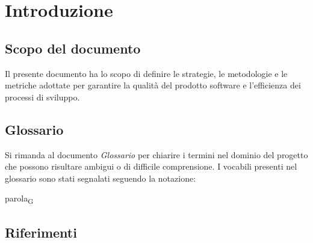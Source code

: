 \documentclass[a4paper,12pt]{article}
\begin{document}
    \tableofcontents
    \newpage

    \listoffigures
    \newpage

    \listoftables
    \newpage
    
    \section{Introduzione} {
        \subsection{Scopo del documento}
            Il presente documento ha lo scopo di definire le strategie, le metodologie e le metriche adottate per garantire la qualità del prodotto software e l'efficienza dei processi di sviluppo.

        \subsection{Glossario}
            Si rimanda al documento \textit{Glossario} per chiarire i termini nel dominio del progetto che possono risultare ambigui o di difficile comprensione. I vocabili presenti nel glossario sono stati segnalati seguendo la notazione:
            \begin{center}
                parola\textsubscript{G}
            \end{center}
        \subsection{Riferimenti}
}
\end{document}
